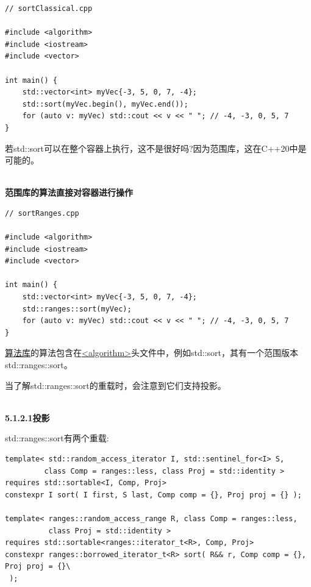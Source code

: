 \begin{lstlisting}[style=styleCXX]
// sortClassical.cpp

#include <algorithm>
#include <iostream>
#include <vector>

int main() {
	std::vector<int> myVec{-3, 5, 0, 7, -4};
	std::sort(myVec.begin(), myVec.end());
	for (auto v: myVec) std::cout << v << " "; // -4, -3, 0, 5, 7
}
\end{lstlisting}

若std::sort可以在整个容器上执行，这不是很好吗?因为范围库，这在C++20中是可能的。

\hspace*{\fill} \\ %
\noindent
\textbf{范围库的算法直接对容器进行操作}
\begin{lstlisting}[style=styleCXX]
// sortRanges.cpp

#include <algorithm>
#include <iostream>
#include <vector>

int main() {
	std::vector<int> myVec{-3, 5, 0, 7, -4};
	std::ranges::sort(myVec);
	for (auto v: myVec) std::cout << v << " "; // -4, -3, 0, 5, 7
}
\end{lstlisting}

\href{https://en.cppreference.com/w/cpp/algorithm}{算法库}的算法包含在\href{https://en.cppreference.com/w/cpp/header/algorithm}{<algorithm>}头文件中，例如std::sort，其有一个范围版本std::ranges::sort。

当了解std::ranges::sort的重载时，会注意到它们支持投影。

\hspace*{\fill} \\ %
\noindent
\textbf{5.1.2.1\hspace{0.2cm}投影}

std::ranges::sort有两个重载:

\begin{lstlisting}[style=styleCXX]
template< std::random_access_iterator I, std::sentinel_for<I> S,
         class Comp = ranges::less, class Proj = std::identity >
requires std::sortable<I, Comp, Proj>
constexpr I sort( I first, S last, Comp comp = {}, Proj proj = {} );

template< ranges::random_access_range R, class Comp = ranges::less,
          class Proj = std::identity >
requires std::sortable<ranges::iterator_t<R>, Comp, Proj>
constexpr ranges::borrowed_iterator_t<R> sort( R&& r, Comp comp = {}, Proj proj = {}\
 );
\end{lstlisting}

